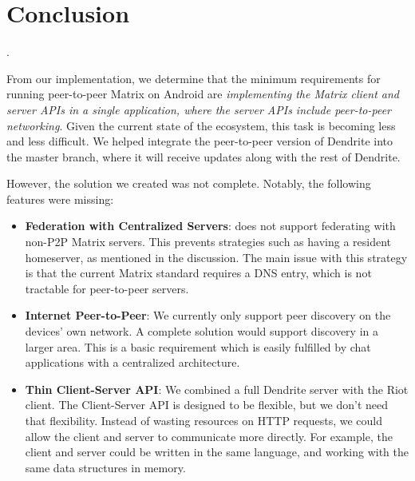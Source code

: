 \chapter{Conclusion}

.

From our implementation, we determine that the minimum requirements for running peer-to-peer Matrix on Android are \textit{implementing the Matrix client and server \ac{API}s in a single application, where the server \ac{API}s include peer-to-peer networking}.
Given the current state of the ecosystem, this task is becoming less and less difficult.
We helped integrate the peer-to-peer version of Dendrite into the master branch, where it will receive updates along with the rest of Dendrite.

However, the solution we created was not complete.
Notably, the following features were missing:
\begin{itemize}
	\item{
	      \textbf{Federation with Centralized Servers}:
	       does not support federating with non-P2P Matrix servers.
	      This prevents strategies such as having a resident homeserver, as mentioned in the discussion.
	      The main issue with this strategy is that the current Matrix standard requires a DNS entry, which is not tractable for peer-to-peer servers.
	      }
	\item{
	      \textbf{Internet Peer-to-Peer}:
	      We currently only support peer discovery on the devices' own network.
	      A complete solution would support discovery in a larger area.
	      This is a basic requirement which is easily fulfilled by chat applications with a centralized architecture.
	      }
	\item{
	      \textbf{Thin Client-Server API}:
	      We combined a full Dendrite server with the Riot client.
	      The Client-Server API is designed to be flexible, but we don't need that flexibility.
	      Instead of wasting resources on HTTP requests, we could allow the client and server to communicate more directly.
	      For example, the client and server could be written in the same language, and working with the same data structures in memory.
	      }
\end{itemize}